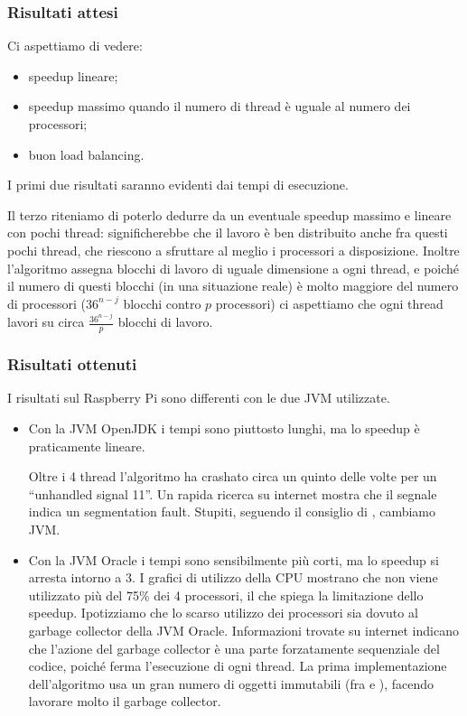 \documentclass[]{myarticle}
\begin{document}
\subsubsection{Risultati attesi}

Ci aspettiamo di vedere:
\begin{itemize}
	\item speedup lineare;
	\item speedup massimo quando il numero di thread \`e uguale al numero dei processori;
	\item buon load balancing.
\end{itemize}
I primi due risultati saranno evidenti dai tempi di esecuzione.

Il terzo riteniamo di poterlo dedurre da un eventuale speedup massimo e lineare con pochi thread: significherebbe che il lavoro \`e ben distribuito anche fra questi pochi thread, che riescono a sfruttare al meglio i processori a disposizione.
Inoltre l'algoritmo assegna blocchi di lavoro di uguale dimensione a ogni thread, e poich\'e il numero di questi blocchi (in una situazione reale) \`e molto maggiore del numero di processori ($36^{n-j}$ blocchi contro $p$ processori) ci aspettiamo che ogni thread lavori su circa $\frac{36^{n-j}}{p}$ blocchi di lavoro.

\subsubsection{Risultati ottenuti}

I risultati sul Raspberry Pi sono differenti con le due JVM utilizzate.
\begin{itemize}
	\item Con la JVM OpenJDK i tempi sono piuttosto lunghi, ma lo speedup \`e praticamente lineare.

	Oltre i 4 thread l'algoritmo ha crashato circa un quinto delle volte per un ``unhandled signal 11''.
	Un rapida ricerca su internet mostra che il segnale indica un segmentation fault.
	Stupiti, seguendo il consiglio di \cite{getrealjava}, cambiamo JVM.
	\item Con la JVM Oracle i tempi sono sensibilmente pi\`u corti, ma lo speedup si arresta intorno a 3.
	I grafici di utilizzo della CPU mostrano che non viene utilizzato pi\`u del 75\% dei 4 processori, il che spiega la limitazione dello speedup.
	Ipotizziamo che lo scarso utilizzo dei processori sia dovuto al garbage collector della JVM Oracle.
	Informazioni trovate su internet indicano che l'azione del garbage collector \`e una parte forzatamente sequenziale del codice, poich\'e ferma l'esecuzione di ogni thread.
	La prima implementazione dell'algoritmo usa un gran numero di oggetti immutabili (fra  e ), facendo lavorare molto il garbage collector.
\end{itemize}
\end{document}
